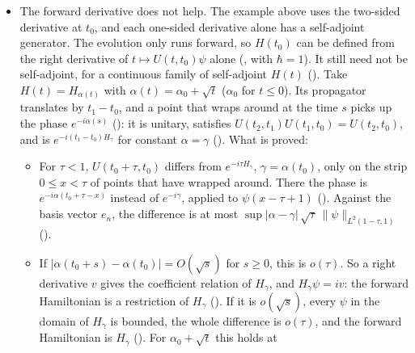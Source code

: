 \documentclass[11pt]{article}
\begin{document}
\begin{itemize}
\begin{itemize}
    (). The necessity of the coefficient
    relation, already for one-sided derivatives, shows that the right derivative of $U(t)\psi$
    at $0$ exists exactly for $\psi$ in the domain of $H_\alpha$, and the left one exactly for
    $\psi$ in the domain of $H_\beta$ (); on $D$,
    $H_0 = H_\alpha = H_\beta$ (,
    ).
  \end{itemize}
\item The forward derivative does not help. The example above uses the two-sided derivative at
  $t_0$, and each one-sided derivative alone has a self-adjoint generator. The evolution only
  runs forward, so $H(t_0)$ can be defined from the right derivative of $t \mapsto U(t,t_0)\psi$
  alone (, with $\hbar = 1$). It still need not be self-adjoint, for a
  continuous family of self-adjoint $H(t)$ (). Take
  $H(t) = H_{\alpha(t)}$ with $\alpha(t) = \alpha_0 + \sqrt t$ ($\alpha_0$ for $t \le 0$). Its
  propagator translates by $t_1 - t_0$, and a point that wraps around at the time $s$ picks up
  the phase $e^{-i\alpha(s)}$ (): it is unitary, satisfies
  $U(t_2,t_1)U(t_1,t_0) = U(t_2,t_0)$, and is $e^{-i(t_1-t_0)H_\gamma}$ for constant
  $\alpha = \gamma$ (). What is proved:
  \begin{itemize}
  \item For $\tau < 1$, $U(t_0+\tau,t_0)$ differs from $e^{-i\tau H_\gamma}$, $\gamma = \alpha(t_0)$,
    only on the strip $0 \le x < \tau$ of points that have wrapped around. There the phase is
    $e^{-i\alpha(t_0+\tau-x)}$ instead of $e^{-i\gamma}$, applied to $\psi(x - \tau + 1)$
    (). Against the basis vector $e_n$, the
    difference is at most $\sup|\alpha - \gamma|\,\sqrt\tau\,\|\psi\|_{L^2(1-\tau,1)}$
    ().
  \item If $|\alpha(t_0+s) - \alpha(t_0)| = O(\sqrt s)$ for $s \ge 0$, this is $o(\tau)$. So a
    right derivative $v$ gives the coefficient relation of $H_\gamma$, and
    $H_\gamma\psi = iv$: the forward Hamiltonian is a restriction of $H_\gamma$
    (). If it is $o(\sqrt s)$, every $\psi$ in the domain
    of $H_\gamma$ is bounded, the whole difference is $o(\tau)$, and the forward Hamiltonian is
    $H_\gamma$ (). For $\alpha_0 + \sqrt t$ this holds at

\end{itemize}
\end{itemize}
\end{document}

